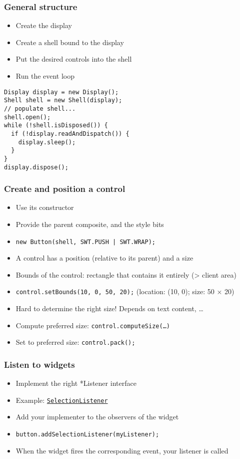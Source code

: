 \documentclass[french, english]{beamer}
\begin{document}
\begin{frame}[fragile]
	\frametitle{General structure}
	\begin{itemize}
		\item Create the display
		\item Create a shell bound to the display
		\item Put the desired controls into the shell
		\item Run the event loop
	\end{itemize}
	\begin{lstlisting}
Display display = new Display();
Shell shell = new Shell(display);
// populate shell...
shell.open();
while (!shell.isDisposed()) {
  if (!display.readAndDispatch()) {
    display.sleep();
  }
}
display.dispose();
	\end{lstlisting}
\end{frame}

\begin{frame}
	\frametitle{Create and position a control}
	\begin{itemize}
		\item Use its constructor
		\item Provide the parent composite, and the style bits
		\item \texttt{new Button(shell, SWT.PUSH | SWT.WRAP);}
		\item A control has a position (relative to its parent) and a size
		\item Bounds of the control: rectangle that contains it entirely (> client area)
		\item \texttt{control.setBounds(10, 0, 50, 20);} (location: (10, 0); size: 50 × 20)
		\item Hard to determine the right size! Depends on text content, …
		\item Compute preferred size: \texttt{control.computeSize(…)}
		\item Set to preferred size: \texttt{control.pack();}
	\end{itemize}
\end{frame}

\begin{frame}
	\frametitle{Listen to widgets}
	\begin{itemize}
		\item Implement the right *Listener interface
		\item Example: \href{https://help.eclipse.org/latest/topic/org.eclipse.platform.doc.isv/reference/api/org/eclipse/swt/events/SelectionListener.html}{\texttt{SelectionListener}}
		\item Add your implementer to the observers of the widget
		\item \texttt{button.addSelectionListener(myListener);}
		\item When the widget fires the corresponding event, your listener is called
	\end{itemize}
\end{frame}
\end{document}
